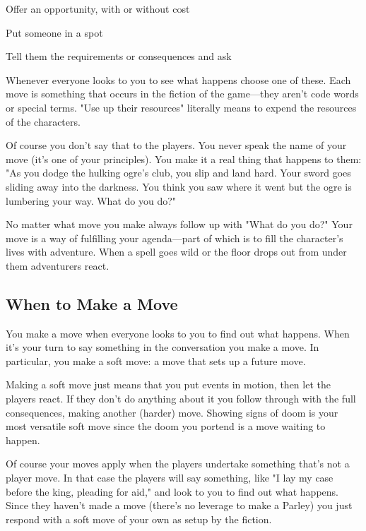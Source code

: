  
\item Offer an opportunity, with or without cost

 
\item Put someone in a spot

 
\item Tell them the requirements or consequences and ask


\stopitemize
 

Whenever everyone looks to you to see what happens choose one of these. Each move is something that occurs in the fiction of the game—they aren't code words or special terms. "Use up their resources" literally means to expend the resources of the characters.

 

Of course you don't say that to the players. You never speak the name of your move (it's one of your principles). You make it a real thing that happens to them: "As you dodge the hulking ogre's club, you slip and land hard. Your sword goes sliding away into the darkness. You think you saw where it went but the ogre is lumbering your way. What do you do?"

 

No matter what move you make always follow up with "What do you do?" Your move is a way of fulfilling your agenda—part of which is to fill the character's lives with adventure. When a spell goes wild or the floor drops out from under them adventurers react.

 
\subsection{When to Make a Move}   
 

You make a move when everyone looks to you to find out what happens. When it's your turn to say something in the conversation you make a move. In particular, you make a soft move: a move that sets up a future move.

 

Making a soft move just means that you put events in motion, then let the players react. If they don't do anything about it you follow through with the full consequences, making another (harder) move. Showing signs of doom is your most versatile soft move since the doom you portend is a move waiting to happen.

 

Of course your moves apply when the players undertake something that's not a player move. In that case the players will say something, like "I lay my case before the king, pleading for aid," and look to you to find out what happens. Since they haven't made a move (there's no leverage to make a Parley) you just respond with a soft move of your own as setup by the fiction.

